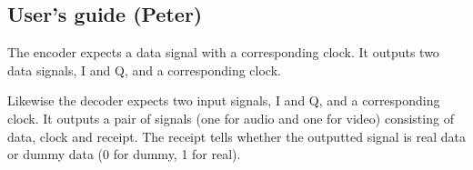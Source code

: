 \subsection{User's guide (Peter)}
The encoder expects a data signal with a corresponding clock. It outputs two data signals, I and Q, and a corresponding clock.

Likewise the decoder expects two input signals, I and Q, and a corresponding clock. It outputs a pair of signals (one for audio and one for video) consisting of data, clock and receipt. The receipt tells whether the outputted signal is real data or dummy data (0 for dummy, 1 for real).
